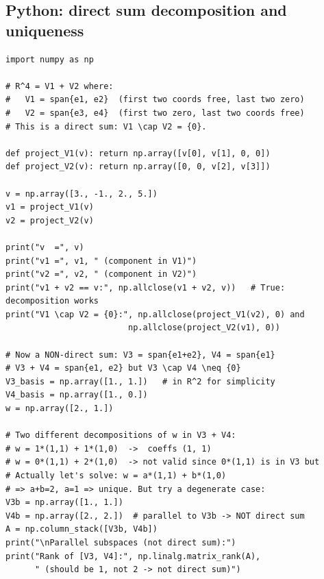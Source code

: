 \documentclass[11pt]{article}
\theoremstyle{definition}
\theoremstyle{plain}
\begin{document}
\subsection{Python: direct sum decomposition and uniqueness}
\begin{lstlisting}
import numpy as np

# R^4 = V1 + V2 where:
#   V1 = span{e1, e2}  (first two coords free, last two zero)
#   V2 = span{e3, e4}  (first two zero, last two coords free)
# This is a direct sum: V1 \cap V2 = {0}.

def project_V1(v): return np.array([v[0], v[1], 0, 0])
def project_V2(v): return np.array([0, 0, v[2], v[3]])

v = np.array([3., -1., 2., 5.])
v1 = project_V1(v)
v2 = project_V2(v)

print("v  =", v)
print("v1 =", v1, " (component in V1)")
print("v2 =", v2, " (component in V2)")
print("v1 + v2 == v:", np.allclose(v1 + v2, v))   # True: decomposition works
print("V1 \cap V2 = {0}:", np.allclose(project_V1(v2), 0) and
                         np.allclose(project_V2(v1), 0))

# Now a NON-direct sum: V3 = span{e1+e2}, V4 = span{e1}
# V3 + V4 = span{e1, e2} but V3 \cap V4 \neq {0}
V3_basis = np.array([1., 1.])   # in R^2 for simplicity
V4_basis = np.array([1., 0.])
w = np.array([2., 1.])

# Two different decompositions of w in V3 + V4:
# w = 1*(1,1) + 1*(1,0)  ->  coeffs (1, 1)
# w = 0*(1,1) + 2*(1,0)  -> not valid since 0*(1,1) is in V3 but
# Actually let's solve: w = a*(1,1) + b*(1,0)
# => a+b=2, a=1 => unique. But try a degenerate case:
V3b = np.array([1., 1.])
V4b = np.array([2., 2.])  # parallel to V3b -> NOT direct sum
A = np.column_stack([V3b, V4b])
print("\nParallel subspaces (not direct sum):")
print("Rank of [V3, V4]:", np.linalg.matrix_rank(A),
      " (should be 1, not 2 -> not direct sum)")
\end{lstlisting}
\end{document}
